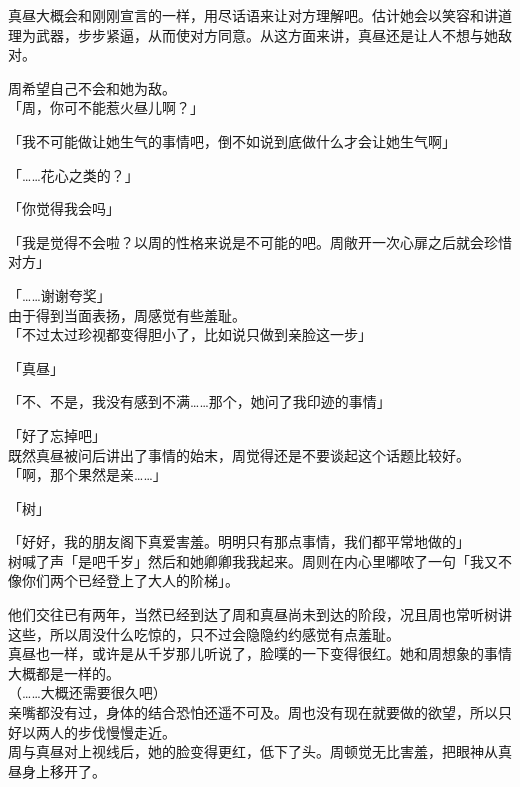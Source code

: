 真昼大概会和刚刚宣言的一样，用尽话语来让对方理解吧。估计她会以笑容和讲道理为武器，步步紧逼，从而使对方同意。从这方面来讲，真昼还是让人不想与她敌对。

周希望自己不会和她为敌。\\

「周，你可不能惹火昼儿啊？」

「我不可能做让她生气的事情吧，倒不如说到底做什么才会让她生气啊」

「……花心之类的？」

「你觉得我会吗」

「我是觉得不会啦？以周的性格来说是不可能的吧。周敞开一次心扉之后就会珍惜对方」

「……谢谢夸奖」\\

由于得到当面表扬，周感觉有些羞耻。\\

「不过太过珍视都变得胆小了，比如说只做到亲脸这一步」

「真昼」

「不、不是，我没有感到不满……那个，她问了我印迹的事情」

「好了忘掉吧」\\

既然真昼被问后讲出了事情的始末，周觉得还是不要谈起这个话题比较好。\\

「啊，那个果然是亲……」

「树」

「好好，我的朋友阁下真爱害羞。明明只有那点事情，我们都平常地做的」\\

树喊了声「是吧千岁」然后和她卿卿我我起来。周则在内心里嘟哝了一句「我又不像你们两个已经登上了大人的阶梯」。

他们交往已有两年，当然已经到达了周和真昼尚未到达的阶段，况且周也常听树讲这些，所以周没什么吃惊的，只不过会隐隐约约感觉有点羞耻。\\

真昼也一样，或许是从千岁那儿听说了，脸噗的一下变得很红。她和周想象的事情大概都是一样的。\\

（……大概还需要很久吧）\\

亲嘴都没有过，身体的结合恐怕还遥不可及。周也没有现在就要做的欲望，所以只好以两人的步伐慢慢走近。\\

周与真昼对上视线后，她的脸变得更红，低下了头。周顿觉无比害羞，把眼神从真昼身上移开了。
